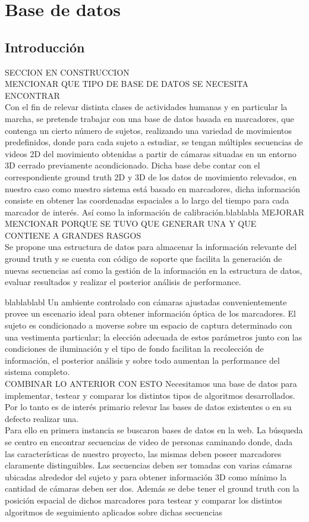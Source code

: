\section{Base de datos} \label{section_base_de_datos}


\subsection{Introducción} SECCION EN CONSTRUCCION\\
MENCIONAR QUE TIPO DE BASE DE DATOS SE NECESITA ENCONTRAR\\
Con el fin de relevar distinta clases de actividades humanas y en particular la marcha, se pretende trabajar con una base de datos basada en marcadores, que contenga un cierto número de sujetos, realizando una variedad de movimientos predefinidos, donde para cada sujeto a estudiar, se tengan múltiples secuencias de videos 2D del movimiento obtenidas a partir de cámaras situadas en un entorno 3D cerrado previamente acondicionado. Dicha base debe contar con el correspondiente ground truth 2D y 3D de los datos de movimiento relevados, en nuestro caso como nuestro sistema está basado en marcadores, dicha información consiste en obtener las coordenadas espaciales a lo largo del tiempo para cada marcador de interés. Así como la información de calibración.blablabla MEJORAR \\

MENCIONAR PORQUE SE TUVO QUE GENERAR UNA Y QUE CONTIENE A GRANDES RASGOS\\
Se propone una estructura de datos para almacenar la información relevante del ground truth y  se cuenta con código de soporte que facilita la generación de nuevas secuencias así como la gestión de la información en la estructura de datos, evaluar resultados y realizar el  posterior análisis de performance.


blablablabl
Un ambiente controlado con cámaras ajustadas convenientemente provee un escenario ideal para obtener información óptica de los marcadores. El sujeto es condicionado a moverse sobre un espacio de captura determinado con una vestimenta particular; la elección adecuada de estos parámetros junto con las condiciones de iluminación y el tipo de fondo facilitan la recolección de información, el posterior análisis y sobre todo aumentan la performance del sistema completo.
\\COMBINAR LO ANTERIOR CON ESTO
Necesitamos una base de datos para implementar, testear y comparar los distintos tipos de algoritmos desarrollados. Por lo tanto es de interés primario relevar las bases de datos existentes o en su defecto realizar una.\\
Para ello en primera instancia se buscaron bases de datos en la web. La búsqueda se centro en encontrar secuencias de video de personas caminando donde, dada las características de nuestro proyecto, las mismas deben poseer marcadores claramente distinguibles. Las secuencias deben ser tomadas con varias cámaras ubicadas alrededor del sujeto y para obtener información 3D como mínimo la cantidad de cámaras deben ser dos. Además se debe tener el ground truth con la posición espacial de dichos marcadores para testear y comparar los distintos algoritmos de seguimiento aplicados sobre dichas secuencias


